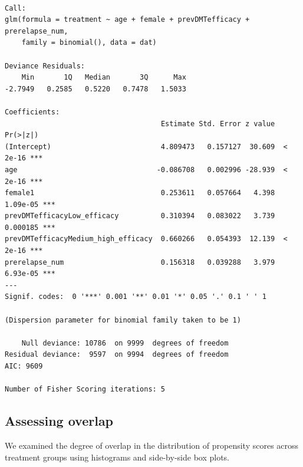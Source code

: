 \documentclass[
  letterpaper,
  DIV=11,
  numbers=noendperiod]{scrreprt}
\newenvironment{Shaded}{\begin{snugshade}}{\end{snugshade}}
\newcommand{\AttributeTok}[1]{\textcolor[rgb]{0.40,0.45,0.13}{#1}}
\newcommand{\CommentTok}[1]{\textcolor[rgb]{0.37,0.37,0.37}{#1}}
\newcommand{\FunctionTok}[1]{\textcolor[rgb]{0.28,0.35,0.67}{#1}}
\newcommand{\NormalTok}[1]{\textcolor[rgb]{0.00,0.23,0.31}{#1}}
\newcommand{\OtherTok}[1]{\textcolor[rgb]{0.00,0.23,0.31}{#1}}
\newcommand{\SpecialCharTok}[1]{\textcolor[rgb]{0.37,0.37,0.37}{#1}}
\newcommand{\StringTok}[1]{\textcolor[rgb]{0.13,0.47,0.30}{#1}}
\begin{document}
\begin{verbatim}

Call:
glm(formula = treatment ~ age + female + prevDMTefficacy + prerelapse_num, 
    family = binomial(), data = dat)

Deviance Residuals: 
    Min       1Q   Median       3Q      Max  
-2.7949   0.2585   0.5220   0.7478   1.5033  

Coefficients:
                                     Estimate Std. Error z value Pr(>|z|)    
(Intercept)                          4.809473   0.157127  30.609  < 2e-16 ***
age                                 -0.086708   0.002996 -28.939  < 2e-16 ***
female1                              0.253611   0.057664   4.398 1.09e-05 ***
prevDMTefficacyLow_efficacy          0.310394   0.083022   3.739 0.000185 ***
prevDMTefficacyMedium_high_efficacy  0.660266   0.054393  12.139  < 2e-16 ***
prerelapse_num                       0.156318   0.039288   3.979 6.93e-05 ***
---
Signif. codes:  0 '***' 0.001 '**' 0.01 '*' 0.05 '.' 0.1 ' ' 1

(Dispersion parameter for binomial family taken to be 1)

    Null deviance: 10786  on 9999  degrees of freedom
Residual deviance:  9597  on 9994  degrees of freedom
AIC: 9609

Number of Fisher Scoring iterations: 5
\end{verbatim}

\begin{Shaded}
\end{Shaded}

\hypertarget{assessing-overlap}{%
\subsection{Assessing overlap}\label{assessing-overlap}}

We examined the degree of overlap in the distribution of propensity
scores across treatment groups using histograms and side-by-side box
plots.
\end{document}
